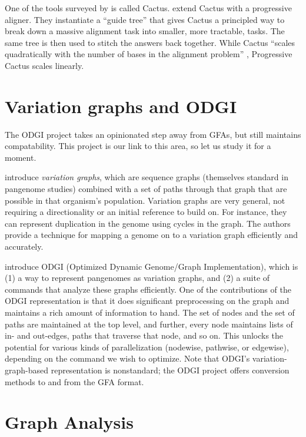 \documentclass[acmsmall, screen]{acmart}
\begin{document}
One of the tools surveyed by \citet{genome_alignment} is called Cactus.
\citet{progcactus} extend Cactus with a progressive aligner. 
They instantiate a ``guide tree'' that gives Cactus a principled way to 
break down a massive alignment task into smaller, more tractable, tasks.
The same tree is then used to stitch the answers back together. 
While Cactus ``scales quadratically with the number of bases in the alignment
problem'' \cite{progcactus}, Progressive Cactus scales linearly.

\section{Variation graphs and ODGI}

The ODGI project takes an opinionated step away from GFAs, 
but still maintains compatability. This project is our link to this 
area, so let us study it for a moment.

\citet{variationgraphs} introduce \emph{variation graphs}, 
which are sequence graphs (themselves standard in pangenome studies) combined
with a set of paths through that graph that are possible in that 
organism's population. Variation graphs are very general, not requiring 
a directionality or an initial reference to build on. 
For instance, they can represent duplication in the genome 
using cycles in the graph. 
The authors provide a technique for mapping a genome on to a variation graph
efficiently and accurately.

\citet{odgi} introduce ODGI 
(Optimized Dynamic Genome/Graph Implementation),
which is (1) a way to represent pangenomes as variation graphs, 
and (2) a suite of commands that analyze these graphs efficiently. 
One of the contributions of the ODGI representation is that it does 
significant preprocessing on the graph and maintains a rich amount of 
information to hand. The set of nodes and the set of paths
are maintained at the top level, and further, every node maintains lists
of in- and out-edges, paths that traverse that node, and so on. 
This unlocks the potential for various kinds of parallelization
(nodewise, pathwise, or edgewise), depending on the command we wish to optimize. 
Note that ODGI's variation-graph-based representation is nonstandard; 
the ODGI project offers conversion methods to and from the GFA format.


\section{Graph Analysis}
\end{document}
